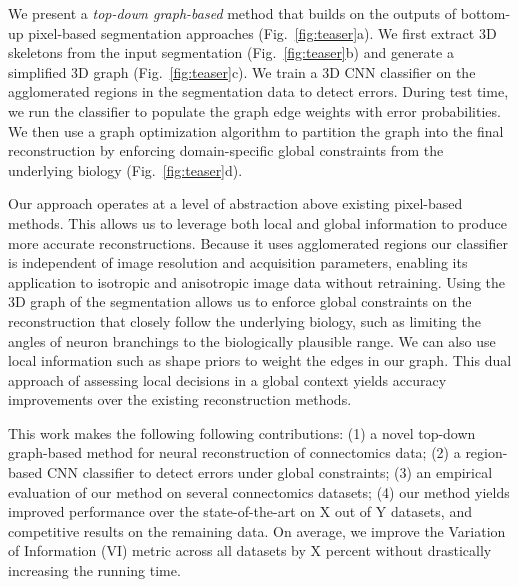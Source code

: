 
We present a \textit{top-down graph-based} method that builds on the outputs of bottom-up pixel-based segmentation approaches (Fig.~\ref{fig:teaser}a). We first extract 3D skeletons from the input segmentation (Fig.~\ref{fig:teaser}b) and generate a simplified 3D graph (Fig.~\ref{fig:teaser}c). We train a 3D CNN classifier on the agglomerated regions in the segmentation data to detect errors. During test time, we run the classifier to populate the graph edge weights with error probabilities. We then use a graph optimization algorithm to partition the graph into the final reconstruction by enforcing domain-specific global constraints from the underlying biology (Fig.~\ref{fig:teaser}d).

Our approach operates at a level of abstraction above existing pixel-based methods. This allows us to leverage both local and global information to produce more accurate reconstructions. Because it uses agglomerated regions our classifier is independent of image resolution and acquisition parameters, enabling its application to isotropic and anisotropic image data without retraining. Using the 3D graph of the segmentation allows us to enforce global constraints on the reconstruction that closely follow the underlying biology, such as limiting the angles of neuron branchings to the biologically plausible range. We can also use local information such as shape priors to weight the edges in our graph. This dual approach of assessing local decisions in a global context yields accuracy improvements over the existing reconstruction methods.

This work makes the following following contributions: (1) a novel top-down graph-based method for neural reconstruction of connectomics data; (2) a region-based CNN classifier to detect errors under global constraints; (3) an empirical evaluation of our method on several connectomics datasets; (4) our method yields improved performance over the state-of-the-art on X out of Y datasets, and competitive results on the remaining data. On average, we improve the Variation of Information (VI) metric across all datasets by X percent without drastically increasing the running time.
